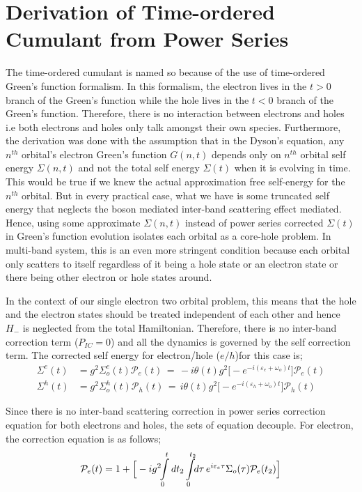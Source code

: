 \documentclass{article}
\begin{document}
\section{Derivation of Time-ordered Cumulant from Power Series}
The time-ordered cumulant is named so because of the use of time-ordered Green's function formalism. In this formalism, the electron lives in the $t>0$ branch of the Green's function while the hole lives in the $t<0$ branch of the Green's function. Therefore, there is no interaction between electrons and holes i.e both electrons and holes only talk amongst their own species.  Furthermore, the derivation was done with the assumption that in the Dyson's equation, any $n^{th}$ orbital's electron Green's function $G(n,t)$ depends only on $n^{th}$ orbital self energy $\Sigma(n,t)$ and not the total self energy $\Sigma(t)$ when it is evolving in time. This would be true if we knew the actual approximation free self-energy for the $n^{th}$ orbital. But in every practical case, what we have is some truncated self energy that neglects the boson mediated inter-band scattering effect mediated. Hence, using some approximate $\Sigma(n,t)$ instead of power series corrected $\Sigma(t)$ in Green's function evolution isolates each orbital as a core-hole problem. In multi-band system, this is an even more stringent condition because each orbital only scatters to itself regardless of it being a hole state or an electron state or there being other electron or hole states around. 

In the context of our single electron two orbital problem, this means that the hole and the electron states should be treated independent of each other and hence $H_-$ is neglected from the total Hamiltonian. Therefore, there is no inter-band correction term ($P_{IC} =0$) and all the dynamics is governed by the self correction term. The corrected self energy for electron/hole ($e/h$)for this case is;
\begin{equation*}
\begin{aligned}
        \Sigma^{e}(t) &=g^2 \Sigma_o^{e}(t)\mathcal{P}_e(t)\, =\,  -i\theta(t)g^2 \big[ - e^{-i(\varepsilon_e +\omega_o)t}\big] \mathcal{P}_e(t)\\
        \Sigma^{h}(t) &= g^2 \Sigma_o^{h}(t)\mathcal{P}_h(t)\, =\,  i\theta(t)g^2 \big[ - e^{-i(\varepsilon_h +\omega_o)t}\big] \mathcal{P}_h(t)
\end{aligned}
\end{equation*}

Since there is no inter-band scattering correction in power series correction equation for both electrons and holes, the sets of equation decouple. For electron, the correction equation is as follows;
\begin{equation*}
    \begin{aligned}
        \mathcal{P}_e(t)=1+ \Big[-ig^2\!\!\int\displaylimits_{0}^{t} dt_2 \int\displaylimits_{0}^{t_2}\!\!d{\tau}\, e^{i\varepsilon_e\tau}\Sigma_o(\tau)\mathcal{P}_e(t_2)\Big]
    \end{aligned}
    \label{single-disp-boson}
\end{equation*}
\end{document}
